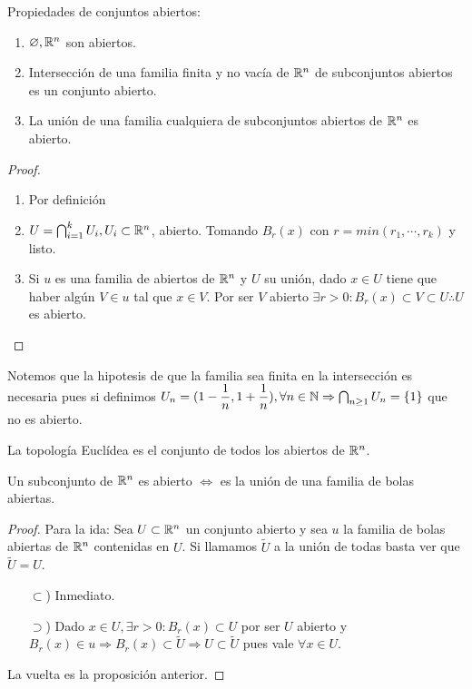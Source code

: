 \begin{prop}
  Propiedades de conjuntos abiertos:
  \begin{enumerate}
    \item $\varnothing, \mathbb{R}^n$ son abiertos.
    \item Intersección de una familia finita y no vacía de $\mathbb{R}^n$ de subconjuntos abiertos es un conjunto abierto.
    \item La unión de una familia cualquiera de subconjuntos abiertos de $\mathbb{R}^n$ es abierto.
  \end{enumerate}
  \begin{proof}
    \begin{enumerate}
      \item Por definición
      \item $U = \bigcap_{i = 1}^k U_i, U_i \subset \mathbb{R}^n$, abierto. Tomando $B_r(x)$ con $r = min(r_1, \cdots, r_k)$ y listo.
      \item Si $u$ es una familia de abiertos de $\mathbb{R}^n$ y $U$ su unión, dado $x \in U$ tiene que haber algún $V \in u$ tal que $x \in V$. Por ser $V$ abierto $\exists r > 0 : B_r(x) \subset V \subset U \therefore U$ es abierto.
    \end{enumerate}
  \end{proof}
\end{prop}

Notemos que la hipotesis de que la familia sea finita en la intersección es necesaria pues si definimos $U_n = (1 - \dfrac{1}{n}, 1 + \dfrac{1}{n}), \forall n \in \mathbb{N} \Rightarrow \bigcap_{n \geq 1} U_n = \{1\}$ que no es abierto.

\begin{definition}
  La topología Euclídea es el conjunto de todos los abiertos de $\mathbb{R}^n$.
\end{definition}

\clearpage

\begin{corollary}
  Un subconjunto de $\mathbb{R}^n$ es abierto $\iff$ es la unión de una familia de bolas abiertas.
  \begin{proof}
    Para la ida: Sea $U \subset \mathbb{R}^n$ un conjunto abierto y sea $u$ la familia de bolas abiertas de $\mathbb{R}^n$ contenidas en $U$. Si llamamos $\tilde{U}$ a la unión de todas basta ver que $\tilde{U} = U$. \begin{itemize}
      \item[$\subset$)] Inmediato.
      \item[$\supset$)] Dado $x \in U, \exists r > 0 : B_r(x) \subset U$ por ser $U$ abierto y $B_r(x) \in u \Rightarrow B_r(x) \subset \tilde{U} \Rightarrow U \subset \tilde{U}$ pues vale $\forall x \in U$.
    \end{itemize}
    La vuelta es la proposición anterior.
  \end{proof}
\end{corollary}

